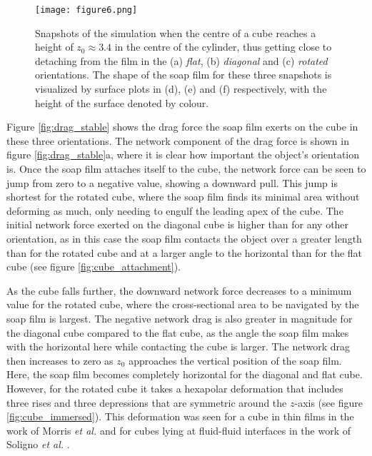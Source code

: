 \documentclass[preprint]{revtex4-1}
\begin{document}
\begin{figure}
\centering
\texttt{[image: figure6.png]}
	\caption{Snapshots of the simulation when the centre of a cube reaches a height of $z_0\approx 3.4$ in the centre of the cylinder, thus getting close to detaching from the film in the (a) \emph{flat}, (b) \emph{diagonal} and (c) \emph{rotated} orientations. The shape of the soap film for these three snapshots is visualized by surface plots in (d), (e) and (f) respectively, with the height of the surface denoted by colour.}
	\label{fig:detachment_comparison}
\end{figure}


Figure \ref{fig:drag_stable} shows the drag force the soap film exerts on the cube in these three orientations. The network component of the drag force is shown in figure \ref{fig:drag_stable}a, where it is clear how important the object's orientation is. Once the soap film attaches itself to the cube, the network force can be seen to jump from zero to a negative value, showing a downward pull. This jump is shortest for the rotated cube, where the soap film finds its minimal area without deforming as much, only needing to engulf the leading apex of the cube.  The initial network force exerted on the diagonal cube is higher than for any other orientation, as in this case the soap film contacts the object over a greater length than for the rotated cube and at a larger angle to the horizontal than for the flat cube (see figure \ref{fig:cube_attachment}). 


As the cube falls further, the downward network force decreases to a minimum value for the rotated cube, where the cross-sectional area to be navigated by the soap film is largest. The negative network drag is also greater in magnitude for the diagonal cube compared to the flat cube, as the angle the soap film makes with the horizontal here while contacting the cube is larger. The network drag then increases to zero as $z_0$ approaches the vertical position of the soap film. Here, the soap film becomes completely horizontal for the diagonal and flat cube. However, for the rotated cube it takes a hexapolar deformation that includes three rises and three depressions that are symmetric around the $z$-axis (see figure \ref{fig:cube_immersed}). This deformation was seen for a cube in thin films in the work of Morris \textit{et al.} \cite{Morris11} and for cubes lying at fluid-fluid interfaces in the work of Soligno \textit{et al.} \cite{Soligno16}. 
\end{document}

